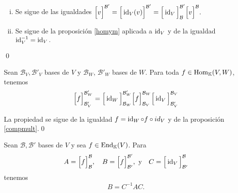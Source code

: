 \dem \begin{enumerate}[(i)]
\item Se sigue de las igualdades $\Big[v\Big]^{\mathcal{B}'}=\Big[\operatorname{id}_V(v)\Big]^{\mathcal{B}'}=\Big[\operatorname{id}_V\Big]^{\mathcal{B}'}_\mathcal{B}\Big[v\Big]^{\mathcal{B}}.$ 
\item Se sigue de la proposici\'on \ref{homym} aplicada a $\operatorname{id}_V$ y de la igualdad $\operatorname{id}_V^{-1}=\operatorname{id}_V.$
\end{enumerate}
\qed

\begin{prop}
Sean $\mathcal{B}_V,\mathcal{B}'_V$ bases de $V$ y $\mathcal{B}_W$, $\mathcal{B}'_W$ bases de $W$. Para toda $f\in\operatorname{Hom}_{\mathbb{K}}(V,W)$, tenemos
\[
\Big[ f\Big]^{\mathcal{B}_W'}_{\mathcal{B}'_V}=\Big[\operatorname{id}_W\Big]^{\mathcal{B}'_W}_{\mathcal{B}_W}\Big[ f\Big]^{\mathcal{B}_W}_{\mathcal{B}_V}\Big[\operatorname{id}_V\Big]^{\mathcal{B}_V}_{\mathcal{B}'_V}
\]
\end{prop}

\dem La propiedad se sigue de la igualdad $f=\operatorname{id}_W\circ f\circ id_V$ y de la proposici\'on \ref{compmult}.\qed

\begin{obs}
Sean $\mathcal{B},\mathcal{B}'$ bases de $V$ y sea $f\in\operatorname{End}_{\mathbb{K}}(V)$. Para
\[
A=\Big[ f\Big]^{\mathcal{B}}_{\mathcal{B}},\quad B=\Big[ f\Big]^{\mathcal{B}'}_{\mathcal{B}'},\textrm{ y}\quad C=\Big[\operatorname{id}_V\Big]^{\mathcal{B}}_{\mathcal{B}'}
\]
tenemos
\[
B=C^{-1}AC.
\]
\end{obs}

